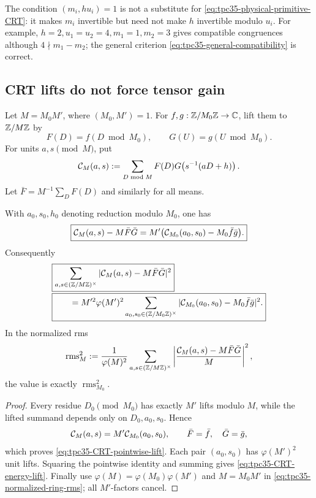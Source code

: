 The condition \((m_i,hu_i)=1\) is not a substitute for
\eqref{eq:tpc35-physical-primitive-CRT}: it makes \(m_i\) invertible but
need not make \(h\) invertible modulo \(u_i\).  For example,
\(h=2,u_1=u_2=4,m_1=1,m_2=3\) gives compatible congruences although
\(4\nmid m_1-m_2\); the general criterion
\eqref{eq:tpc35-general-compatibility} is correct.

\subsection{CRT lifts do not force tensor gain}

Let \(M=M_0M'\), where \((M_0,M')=1\).  For
\(f,g:\mathbb Z/M_0\mathbb Z\to\mathbb C\), lift them to \(\mathbb Z/M\mathbb Z\) by
\begin{equation}
 F(D)=f(D\bmod M_0),\qquad G(U)=g(U\bmod M_0).
 \label{eq:tpc35-coordinate-lifts}
\end{equation}
For units \(a,s\pmod M\), put
\begin{equation}
 \mathcal C_M(a,s)
 :=\sum_{D\bmod M}F(D)
 G\!\left(s^{-1}(aD+h)\right).
 \label{eq:tpc35-ring-correlation}
\end{equation}
Let \(\bar F=M^{-1}\sum_DF(D)\) and similarly for all means.

\begin{theorem}
\label{thm:tpc35-CRT-lift}
With \(a_0,s_0,h_0\) denoting reduction modulo \(M_0\), one has
\begin{equation}
 \boxed{
 \mathcal C_M(a,s)-M\bar F\bar G
 =M'\bigl(\mathcal C_{M_0}(a_0,s_0)-M_0\bar f\bar g\bigr).}
 \label{eq:tpc35-CRT-pointwise-lift}
\end{equation}
Consequently
\begin{align}
 &\boxed{
 \sum_{a,s\in(\mathbb Z/M\mathbb Z)^\times}
 |\mathcal C_M(a,s)-M\bar F\bar G|^2}
 \notag\\[-0.2em]
 &\boxed{\qquad
 =M'^2\varphi(M')^2
 \sum_{a_0,s_0\in(\mathbb Z/M_0\mathbb Z)^\times}
 |\mathcal C_{M_0}(a_0,s_0)-M_0\bar f\bar g|^2.}
 \label{eq:tpc35-CRT-energy-lift}
\end{align}
In the normalized rms
\begin{equation}
 \operatorname{rms}_M^2
 :=\frac1{\varphi(M)^2}
 \sum_{a,s\in(\mathbb Z/M\mathbb Z)^\times}
 \left|\frac{\mathcal C_M(a,s)-M\bar F\bar G}{M}\right|^2,
 \label{eq:tpc35-normalized-ring-rms}
\end{equation}
the value is exactly \(\operatorname{rms}_{M_0}^2\).
\end{theorem}

\begin{proof}
Every residue \(D_0\pmod {M_0}\) has exactly \(M'\) lifts modulo \(M\), while
the lifted summand depends only on \(D_0,a_0,s_0\).  Hence
\[
 \mathcal C_M(a,s)=M'\mathcal C_{M_0}(a_0,s_0),
 \qquad \bar F=\bar f,\quad\bar G=\bar g,
\]
which proves \eqref{eq:tpc35-CRT-pointwise-lift}.  Each pair
\((a_0,s_0)\) has \(\varphi(M')^2\) unit lifts.  Squaring the pointwise
identity and summing gives \eqref{eq:tpc35-CRT-energy-lift}.  Finally use
\(
 \varphi(M)=\varphi(M_0)\varphi(M')
\)
and \(M=M_0M'\) in \eqref{eq:tpc35-normalized-ring-rms}; all \(M'\)-factors
cancel.
\end{proof}

